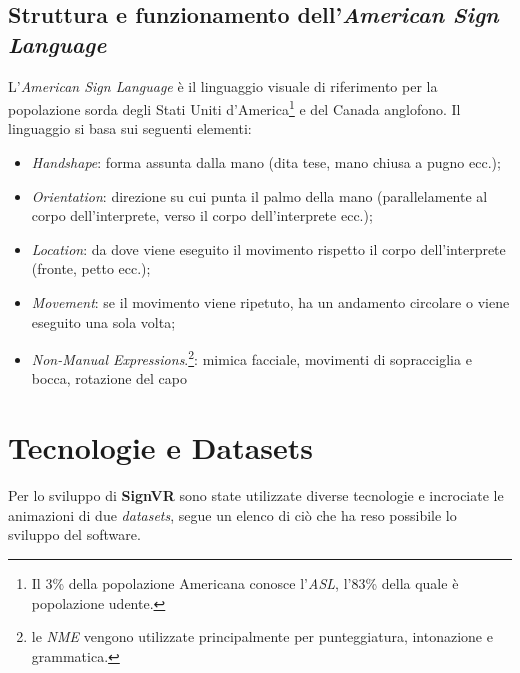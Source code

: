 \documentclass[12pt, a4paper]{article}
\begin{document}
    \subsection{Struttura e funzionamento dell'\textit{American Sign Language}}
        L'\textit{American Sign Language} è il linguaggio visuale di riferimento per la 
        popolazione sorda degli Stati Uniti d'America\footnote{Il 3\% della popolazione 
        Americana conosce l'\textit{ASL}, l'83\% della quale è popolazione udente.}
        e del Canada anglofono\cite{ethnologuease}\cite{howmanypeopleusesignlanguage}. 
        Il linguaggio si basa sui seguenti elementi:
        \begin{itemize}
            \item \textit{Handshape}: forma assunta dalla mano 
            (dita tese, mano chiusa a pugno ecc.);

            \item \textit{Orientation}: direzione su cui punta il palmo della mano 
            (parallelamente al corpo dell'interprete, verso il corpo dell'interprete ecc.);

            \item \textit{Location}: da dove viene eseguito il movimento rispetto il corpo 
            dell'interprete (fronte, petto ecc.);

            \item \textit{Movement}: se il movimento viene ripetuto, 
            ha un andamento circolare o viene eseguito una sola volta;

            \item \textit{Non-Manual Expressions}.\footnote{le \textit{NME} 
            vengono utilizzate principalmente per punteggiatura, intonazione e grammatica.}: 
            mimica facciale, movimenti di sopracciglia e bocca, rotazione del capo
        \end{itemize}
\section{Tecnologie e Datasets}
    Per lo sviluppo di \textbf{SignVR} sono state utilizzate diverse tecnologie e 
    incrociate le animazioni di due \textit{datasets}, segue un elenco di ciò 
    che ha reso possibile lo sviluppo del software.
\end{document}
